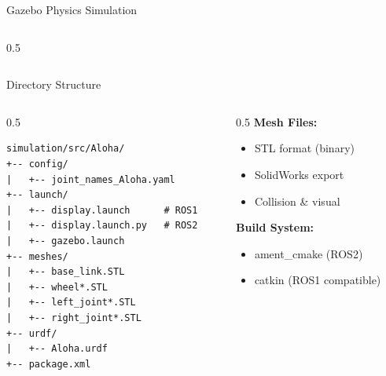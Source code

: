 \begin{frame}[shrink=3]{Gazebo Physics Simulation}
\begin{columns}
\begin{column}{0.5\textwidth}
\end{column}
\end{columns}
\end{frame}

\begin{frame}[fragile,shrink=3]{Directory Structure}
\begin{columns}
\begin{column}{0.5\textwidth}
\begin{lstlisting}[basicstyle=\ttfamily\tiny,numbers=none,frame=none]
simulation/src/Aloha/
+-- config/
|   +-- joint_names_Aloha.yaml
+-- launch/
|   +-- display.launch      # ROS1
|   +-- display.launch.py   # ROS2
|   +-- gazebo.launch
+-- meshes/
|   +-- base_link.STL
|   +-- wheel*.STL
|   +-- left_joint*.STL
|   +-- right_joint*.STL
+-- urdf/
|   +-- Aloha.urdf
+-- package.xml
\end{lstlisting}
\end{column}
\begin{column}{0.5\textwidth}
    \textbf{Mesh Files:}
    \begin{itemize}
        \item STL format (binary)
        \item SolidWorks export
        \item Collision \& visual
    \end{itemize}

    \vspace{0.2cm}

    \textbf{Build System:}
    \begin{itemize}
        \item ament\_cmake (ROS2)
        \item catkin (ROS1 compatible)
    \end{itemize}
\end{column}
\end{columns}
\end{frame}

